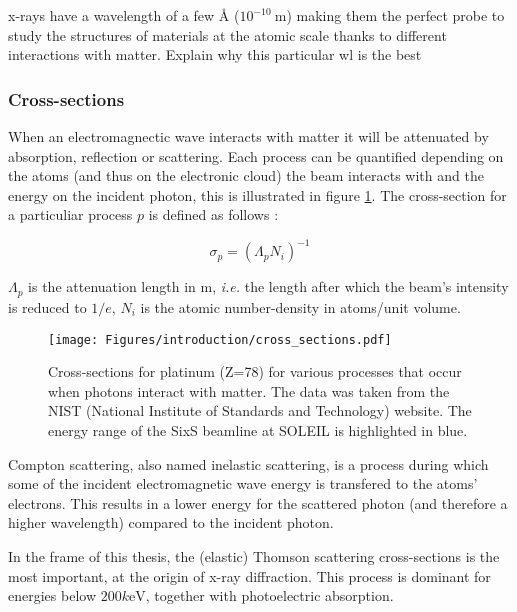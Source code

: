 x-rays have a wavelength of a few \si{\angstrom} ($10^{-10} \:\si{\meter}$) making them the perfect probe to study the structures of materials at the atomic scale thanks to different interactions with matter.
\textcolor{Important}{Explain why this particular wl is the best}

\subsubsection{Cross-sections}

When an electromagnectic wave interacts with matter it will be attenuated by absorption, reflection or scattering.
Each process can be quantified depending on the atoms (and thus on the electronic cloud) the beam interacts with and the energy on the incident photon, this is illustrated in figure \ref{fig:cross_sections}.
The cross-section for a particuliar process $p$ is defined as follows \parencite{Willmott}:

\begin{equation}
	\sigma_p = (\Lambda_p N_i)^{-1}
\end{equation}

$\Lambda_p$ is the attenuation length in \si{\meter}, \textit{i.e.} the length after which the beam's intensity is reduced to $1/e$, $N_i$ is the atomic number-density in atoms/unit volume.

\begin{figure}[!htb]
    \centering
    \texttt{[image: Figures/introduction/cross\_sections.pdf]}
    \caption{Cross-sections for platinum (Z=78) for various processes that occur when photons interact with matter. The data was taken from the NIST (National Institute of Standards and Technology) \parencite{NIST_cross_sections} website. The energy range of the SixS beamline at SOLEIL is highlighted in blue.}
    \label{fig:cross_sections}
\end{figure}

Compton scattering, also named inelastic scattering, is a process during which some of the incident electromagnetic wave energy is transfered to the atoms' electrons.
This results in a lower energy for the scattered photon (and therefore a higher wavelength) compared to the incident photon.

In the frame of this thesis, the (elastic) Thomson scattering cross-sections is the most important, at the origin of x-ray diffraction.
This process is dominant for energies below $200 \si{k\electronvolt}$, together with photoelectric absorption.%

